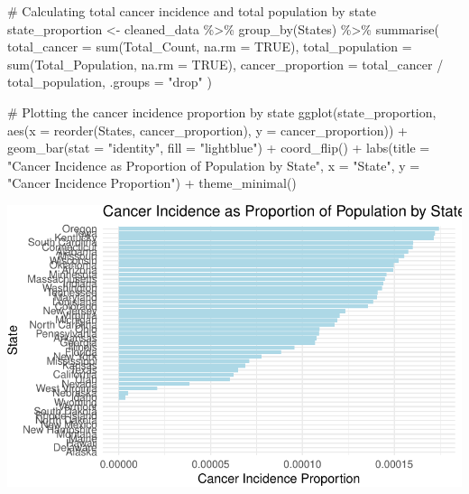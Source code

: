\documentclass[
  12pt,
]{article}
\newenvironment{Shaded}{\begin{snugshade}}{\end{snugshade}}
\newcommand{\AttributeTok}[1]{\textcolor[rgb]{0.40,0.45,0.13}{#1}}
\newcommand{\CommentTok}[1]{\textcolor[rgb]{0.37,0.37,0.37}{#1}}
\newcommand{\ConstantTok}[1]{\textcolor[rgb]{0.56,0.35,0.01}{#1}}
\newcommand{\FunctionTok}[1]{\textcolor[rgb]{0.28,0.35,0.67}{#1}}
\newcommand{\NormalTok}[1]{\textcolor[rgb]{0.00,0.23,0.31}{#1}}
\newcommand{\OtherTok}[1]{\textcolor[rgb]{0.00,0.23,0.31}{#1}}
\newcommand{\SpecialCharTok}[1]{\textcolor[rgb]{0.37,0.37,0.37}{#1}}
\newcommand{\StringTok}[1]{\textcolor[rgb]{0.13,0.47,0.30}{#1}}
\begin{document}
\begin{Shaded}
\begin{Highlighting}[]
\CommentTok{\# Calculating total cancer incidence and total population by state}
\NormalTok{state\_proportion }\OtherTok{\textless{}{-}}\NormalTok{ cleaned\_data }\SpecialCharTok{\%\textgreater{}\%}
  \FunctionTok{group\_by}\NormalTok{(States) }\SpecialCharTok{\%\textgreater{}\%}
  \FunctionTok{summarise}\NormalTok{(}
    \AttributeTok{total\_cancer =} \FunctionTok{sum}\NormalTok{(Total\_Count, }\AttributeTok{na.rm =} \ConstantTok{TRUE}\NormalTok{),}
    \AttributeTok{total\_population =} \FunctionTok{sum}\NormalTok{(Total\_Population, }\AttributeTok{na.rm =} \ConstantTok{TRUE}\NormalTok{),}
    \AttributeTok{cancer\_proportion =}\NormalTok{ total\_cancer }\SpecialCharTok{/}\NormalTok{ total\_population,}
    \AttributeTok{.groups =} \StringTok{"drop"}
\NormalTok{  )}

\CommentTok{\# Plotting the cancer incidence proportion by state}
\FunctionTok{ggplot}\NormalTok{(state\_proportion, }\FunctionTok{aes}\NormalTok{(}\AttributeTok{x =} \FunctionTok{reorder}\NormalTok{(States, cancer\_proportion), }\AttributeTok{y =}\NormalTok{ cancer\_proportion)) }\SpecialCharTok{+}
  \FunctionTok{geom\_bar}\NormalTok{(}\AttributeTok{stat =} \StringTok{"identity"}\NormalTok{, }\AttributeTok{fill =} \StringTok{"lightblue"}\NormalTok{) }\SpecialCharTok{+}
  \FunctionTok{coord\_flip}\NormalTok{() }\SpecialCharTok{+}
  \FunctionTok{labs}\NormalTok{(}\AttributeTok{title =} \StringTok{"Cancer Incidence as Proportion of Population by State"}\NormalTok{, }
       \AttributeTok{x =} \StringTok{"State"}\NormalTok{, }
       \AttributeTok{y =} \StringTok{"Cancer Incidence Proportion"}\NormalTok{) }\SpecialCharTok{+}
  \FunctionTok{theme\_minimal}\NormalTok{()}
\end{Highlighting}
\end{Shaded}

\includegraphics{final_main_quarto_presentation_files/figure-pdf/unnamed-chunk-15-1.pdf}
\end{document}
